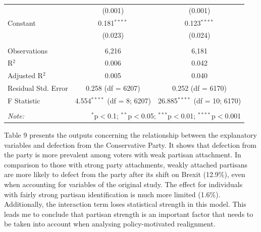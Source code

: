\documentclass[12pt,letterpaper]{article}
\begin{document}
\begin{table}[H]
{\begin{tabular}{@{\extracolsep{5pt}}lcc}
				& (0.001) & (0.001) \\ 
				Constant & 0.181$^{****}$ & 0.123$^{****}$ \\ 
				& (0.023) & (0.024) \\ 
				\hline \\[-1.8ex] 
				Observations & 6,216 & 6,181 \\ 
				R$^{2}$ & 0.006 & 0.042 \\ 
				Adjusted R$^{2}$ & 0.005 & 0.040 \\ 
				Residual Std. Error & 0.258 (df = 6207) & 0.252 (df = 6170) \\ 
				F Statistic & 4.554$^{****}$ (df = 8; 6207) & 26.885$^{****}$ (df = 10; 6170) \\ 
				\hline 
				\hline \\[-1.8ex] 
				\textit{Note:}  & \multicolumn{2}{r}{$^{*}$p$<$0.1; $^{**}$p$<$0.05; $^{***}$p$<$0.01; $^{****}$p$<$0.001};  \\ 
			\end{tabular} 
		}
	\end{table} 
	
	Table 9 presents the outputs concerning the relationship between the explanatory variables and defection from the Conservative Party. It shows that defection from the party is more prevalent among voters with weak partisan attachment. In comparison to those with strong party attachments, weakly attached partisans are more likely to defect from the party after its shift on Brexit (12.9\%), even when accounting for variables of the original study. The effect for individuals with fairly strong partisan identification is much more limited (1.6\%). Additionally, the interaction term loses statistical strength in this model. This leads me to conclude that partisan strength is an important factor that needs to be taken into account when analysing policy-motivated realignment.
	
\end{document}
